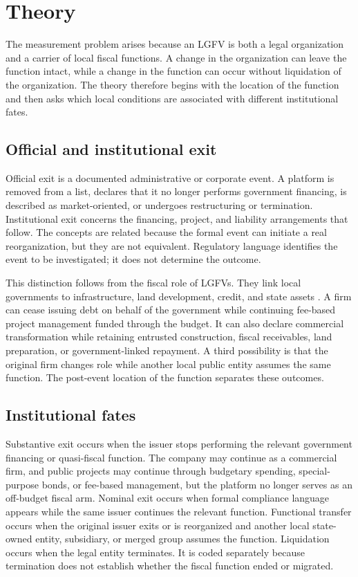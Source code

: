\section{Theory}

The measurement problem arises because an LGFV is both a legal organization and
a carrier of local fiscal functions. A change in the organization can leave the
function intact, while a change in the function can occur without liquidation
of the organization. The theory therefore begins with the location of the
function and then asks which local conditions are associated with different
institutional fates.

\subsection{Official and institutional exit}

Official exit is a documented administrative or corporate event. A platform is
removed from a list, declares that it no longer performs government financing,
is described as market-oriented, or undergoes restructuring or termination.
Institutional exit concerns the financing, project, and liability arrangements
that follow. The concepts are related because the formal event can initiate a
real reorganization, but they are not equivalent. Regulatory language identifies
the event to be investigated; it does not determine the outcome.

This distinction follows from the fiscal role of LGFVs. They link local
governments to infrastructure, land development, credit, and state assets
\citep{wong2013,tsui2011,jin_rial_2016_lgfv_ppp}. A firm can cease issuing debt
on behalf of the government while continuing fee-based project management
funded through the budget. It can also declare commercial transformation while
retaining entrusted construction, fiscal receivables, land preparation, or
government-linked repayment. A third possibility is that the original firm
changes role while another local public entity assumes the same function. The
post-event location of the function separates these outcomes.

\subsection{Institutional fates}

Substantive exit occurs when the issuer stops performing the relevant
government financing or quasi-fiscal function. The company may continue as a
commercial firm, and public projects may continue through budgetary spending,
special-purpose bonds, or fee-based management, but the platform no longer
serves as an off-budget fiscal arm. Nominal exit occurs when formal compliance
language appears while the same issuer continues the relevant function.
Functional transfer occurs when the original issuer exits or is reorganized and
another local state-owned entity, subsidiary, or merged group assumes the
function. Liquidation occurs when the legal entity terminates. It is coded
separately because termination does not establish whether the fiscal function
ended or migrated.

